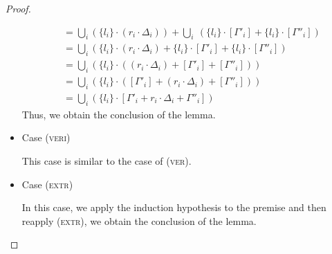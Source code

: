 \begin{proof}
\begin{itemize}
\begin{align*}
&= \bigcup_{i}\left(\{l_i\}\cdot\left(r_i\cdot\Delta_i\right)\right) + \bigcup_{i} \ \left(\{l_i\}\cdot[\Gamma'_i] + \{l_i\}\cdot[\Gamma''_i]\right) \tag{$\because$ $\Delta_i$ definition}\\
&= \bigcup_i\left(\{l_i\}\cdot\left(r_i\cdot\Delta_i\right) + \{l_i\}\cdot[\Gamma'_i] + \{l_i\}\cdot[\Gamma''_i]\right) \tag{$\because$ $+$ commutativity \& associativity}\\
&= \bigcup_{i} \left(\{l_i\}\cdot\left(\left(r_i\cdot\Delta_i\right) + [\Gamma'_i] + [\Gamma''_i]\right)\right) \tag{$\because$ districutive law}\\
&= \bigcup_{i} \left(\{l_i\}\cdot\left([\Gamma'_i] + \left(r_i\cdot\Delta_i\right) + [\Gamma''_i]\right)\right) \tag{$\because$ $+$ commutativity}\\
&= \bigcup_{i} \left(\{l_i\}\cdot[\Gamma'_i + r_i\cdot\Delta_i + \Gamma''_i]\right) \tag{$\because$ $[\cdot]$ definition}
\end{align*}
Thus, we obtain the conclusion of the lemma.
\\


\item Case (\textsc{veri})
\begin{center}
    \begin{minipage}{.55\linewidth}
    \end{minipage}
\end{center}
This case is similar to the case of (\textsc{ver}).
\\

\item Case (\textsc{extr})
\begin{center}
    \begin{minipage}{.45\linewidth}
    \end{minipage}
\end{center}
In this case, we apply the induction hypothesis to the premise and then reapply (\textsc{extr}), we obtain the conclusion of the lemma.
\\


\end{itemize}
\end{proof}

